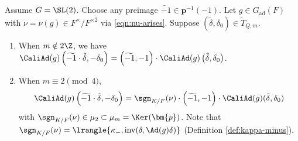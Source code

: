 \documentclass[a4paper,10pt]{article}
\begin{document}
\begin{proposition}\label{prop:CAd-minus-1}
	Assume $G = \SL(2)$. Choose any preimage $\widetilde{-1} \in \bm{p}^{-1}(-1)$. Let $g \in G_\mathrm{ad}(F)$ with $\nu = \nu(g) \in F^\times/F^{\times 2}$ via \eqref{eqn:nu-arises}. Suppose $(\tilde{\delta}, \delta_0) \in \tilde{T}_{Q,m}$.
	\begin{enumerate}
		\item When $m \notin 2\Z$, we have $\CaliAd(g)\left( \widetilde{-1} \cdot \tilde{\delta}, -\delta_0 \right) = \left( \widetilde{-1}, -1\right) \cdot \CaliAd(g)\left(\tilde{\delta}, \delta_0 \right)$.
		\item When $m \equiv 2 \pmod 4$,
			\[ \CaliAd(g)\left( \widetilde{-1} \cdot \tilde{\delta}, -\delta_0 \right) = \sgn_{K/F}(\nu) \cdot \left( \widetilde{-1}, -1 \right) \cdot \CaliAd(g)(\tilde{\delta}, \delta_0) \]
			with $\sgn_{K/F}(\nu) \in \mu_2 \subset \mu_m = \Ker(\bm{p})$. Note that $\sgn_{K/F}(\nu) = \lrangle{\kappa_-, \mathrm{inv}(\delta, \Ad(g)\delta)}$ (Definition \ref{def:kappa-minus}).
	\end{enumerate}
\end{proposition}
\end{document}

